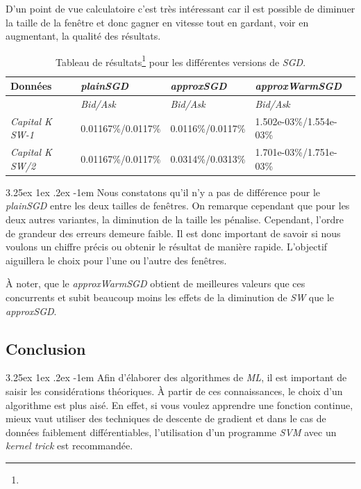 \documentclass[a4paper, 11pt]{article}
\makeatletter
\renewcommand\paragraph{\@startsection{paragraph}{5}{\z@}%
  {3.25ex \@plus1ex \@minus.2ex}%
  {-1em}%
  {\normalfont\normalsize\bfseries}}
\makeatother
\begin{document}
D'un point de vue calculatoire c'est très intéressant car il est possible de diminuer la taille de la fenêtre et
donc gagner en vitesse tout en gardant, voir en augmentant, la qualité des résultats.


\begin{table}[H]
	\centering
\begin{tabular}{|l|l|l|l|}
	\hline
	Données & \textit{plainSGD} & \textit{approxSGD} & \textit{approxWarmSGD}\\
	\hline
	\ & \textit{Bid/Ask} & \textit{Bid/Ask} & \textit{Bid/Ask} \\
	\hline
	\textit{Capital K SW-1} & 0.01167\%/0.0117\% & 0.0116\%/0.0117\% & 1.502e-03\%/1.554e-03\% \\
	\hline
	\textit{Capital K SW/2} & 0.01167\%/0.0117\% & 0.0314\%/0.0313\% & 1.701e-03\%/1.751e-03\%\\
	\hline

\end{tabular}
\caption[]{Tableau de résultats\footnote{} pour les différentes versions de \textit{SGD}.}
\end{table}


\paragraph{}
Nous constatons qu'il n'y a pas de différence pour le \textit{plainSGD} entre les deux tailles de fenêtres. On
remarque cependant que pour les deux autres variantes, la diminution de la taille les pénalise. Cependant, l'ordre
de grandeur des erreurs demeure faible. Il est donc important de savoir si nous voulons un chiffre précis ou obtenir
le résultat de manière rapide. L'objectif aiguillera le choix pour l'une ou l'autre des fenêtres.

À noter, que le \textit{approxWarmSGD} obtient de meilleures valeurs que ces concurrents et subit beaucoup moins
les effets de la diminution de \textit{SW} que le \textit{approxSGD}.

\subsection{Conclusion}
\paragraph{}
Afin d'élaborer des algorithmes de \textit{ML}, il est important de saisir les considérations théoriques.
À partir de ces connaissances, le choix d'un algorithme est plus aisé. En effet, si vous voulez apprendre une fonction
continue, mieux vaut utiliser des techniques de descente de gradient et dans le cas de données faiblement différentiables, 
l'utilisation d'un programme \textit{SVM} avec un \textit{kernel trick} est recommandée.
\end{document}
